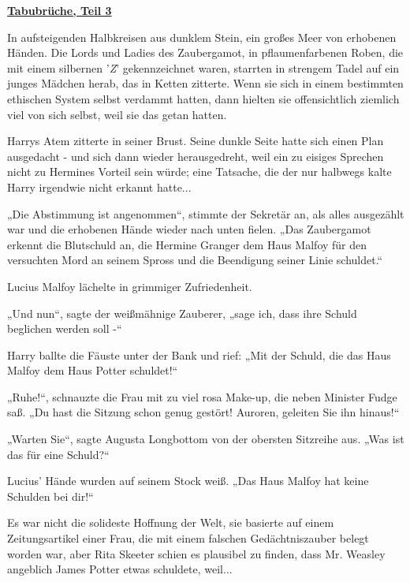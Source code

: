 

\hypertarget{tabubruxfcche-teil-3}{%

\textbf{\uline{Tabubrüche, Teil 3}}

\hfill\break In aufsteigenden Halbkreisen aus dunklem Stein, ein großes Meer von erhobenen Händen. Die Lords und Ladies des Zaubergamot, in pflaumenfarbenen Roben, die mit einem silbernen '\emph{Z}' gekennzeichnet waren, starrten in strengem Tadel auf ein junges Mädchen herab, das in Ketten zitterte. Wenn sie sich in einem bestimmten ethischen System selbst verdammt hatten, dann hielten sie offensichtlich ziemlich viel von sich selbst, weil sie das getan hatten.

Harrys Atem zitterte in seiner Brust. Seine dunkle Seite hatte sich einen Plan ausgedacht - und sich dann wieder herausgedreht, weil ein zu eisiges Sprechen nicht zu Hermines Vorteil sein würde; eine Tatsache, die der nur halbwegs kalte Harry irgendwie nicht erkannt hatte...

„Die Abstimmung ist angenommen“, stimmte der Sekretär an, als alles ausgezählt war und die erhobenen Hände wieder nach unten fielen. „Das Zaubergamot erkennt die Blutschuld an, die Hermine Granger dem Haus Malfoy für den versuchten Mord an seinem Spross und die Beendigung seiner Linie schuldet.“

Lucius Malfoy lächelte in grimmiger Zufriedenheit.

„Und nun“, sagte der weißmähnige Zauberer, „sage ich, dass ihre Schuld beglichen werden soll -“

Harry ballte die Fäuste unter der Bank und rief: „Mit der Schuld, die das Haus Malfoy dem Haus Potter schuldet!“

„Ruhe!“, schnauzte die Frau mit zu viel rosa Make-up, die neben Minister Fudge saß. „Du hast die Sitzung schon genug gestört! Auroren, geleiten Sie ihn hinaus!“

„Warten Sie“, sagte Augusta Longbottom von der obersten Sitzreihe aus. „Was ist das für eine Schuld?“

Lucius' Hände wurden auf seinem Stock weiß. „Das Haus Malfoy hat keine Schulden bei dir!“

Es war nicht die solideste Hoffnung der Welt, sie basierte auf einem Zeitungsartikel einer Frau, die mit einem falschen Gedächtniszauber belegt worden war, aber Rita Skeeter schien es plausibel zu finden, dass Mr. Weasley angeblich James Potter etwas schuldete, weil...

}
